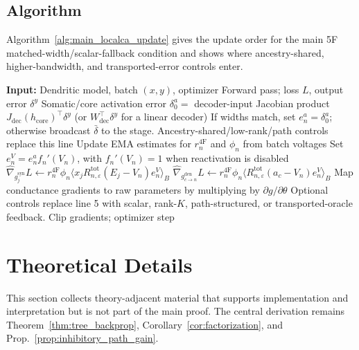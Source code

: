    \subsection{Algorithm}
    Algorithm~\ref{alg:main_localca_update} gives the update order for the main 5F matched-width/scalar-fallback condition and shows where ancestry-shared, higher-bandwidth, and transported-error controls enter.
    \begin{algorithm}[H]
    \caption{Main 5F Matched-Width/Scalar-Fallback LocalCA Update}\small
    \label{alg:main_localca_update}
    \begin{algorithmic}[1]
    \STATE \textbf{Input:} Dendritic model, batch $(x,y)$, optimizer
    \STATE Forward pass; loss $L$, output error $\delta^y$
    \STATE Somatic/core activation error $\delta_0^a =$ decoder-input Jacobian product $J_{\mathrm{dec}}(h_{\mathrm{core}})^\top \delta^y$ (or $W_{\mathrm{dec}}^\top\delta^y$ for a linear decoder)
        \STATE If widths match, set $e_n^a=\delta_0^a$; otherwise broadcast $\bar{\delta}$ to the stage. Ancestry-shared/low-rank/path controls replace this line
        \STATE Update EMA estimates for $r_n^{\mathrm{4F}}$ and $\phi_n$ from batch voltages
        \STATE Set $e_n^V=e_n^a f_n'(V_n)$, with $f_n'(V_n)=1$ when reactivation is disabled
        \STATE $\widehat{\nabla}_{g_j^{\mathrm{syn}}}L \leftarrow r_n^{\mathrm{4F}}\phi_n\langle x_j R_{n,\varepsilon}^{\mathrm{tot}}(E_j-V_n)e_n^V\rangle_B$
        \STATE $\widehat{\nabla}_{g_{c\to n}^{\mathrm{den}}}L \leftarrow r_n^{\mathrm{4F}}\phi_n\langle R_{n,\varepsilon}^{\mathrm{tot}}(a_c-V_n)e_n^V\rangle_B$
        \STATE Map conductance gradients to raw parameters by multiplying by $\partial g/\partial\theta$
    \ENDFOR
    \STATE Optional controls replace line 5 with scalar, rank-$K$, path-structured, or transported-oracle feedback.
    \STATE Clip gradients; optimizer step
    \end{algorithmic}
    \end{algorithm}
    
    \section{Theoretical Details}
    \label{app:theory}
    This section collects theory-adjacent material that supports implementation and interpretation but is not part of the main proof. The central derivation remains Theorem~\ref{thm:tree_backprop}, Corollary~\ref{cor:factorization}, and Prop.~\ref{prop:inhibitory_path_gain}.

